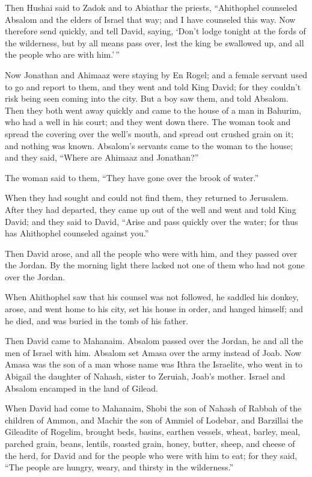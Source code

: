  Then Hushai said to Zadok and to Abiathar the priests,
``Ahithophel counseled Absalom and the elders of Israel that way; and I
have counseled this way.  Now therefore send quickly, and
tell David, saying, `Don't lodge tonight at the fords of the wilderness,
but by all means pass over, lest the king be swallowed up, and all the
people who are with him.'\,''

 Now Jonathan and Ahimaaz were staying by En Rogel; and a
female servant used to go and report to them, and they went and told
King David; for they couldn't risk being seen coming into the city.
 But a boy saw them, and told Absalom. Then they both
went away quickly and came to the house of a man in Bahurim, who had a
well in his court; and they went down there.  The woman
took and spread the covering over the well's mouth, and spread out
crushed grain on it; and nothing was known.  Absalom's
servants came to the woman to the house; and they said, ``Where are
Ahimaaz and Jonathan?''

The woman said to them, ``They have gone over the brook of water.''

When they had sought and could not find them, they returned to
Jerusalem.  After they had departed, they came up out of
the well and went and told King David; and they said to David, ``Arise
and pass quickly over the water; for thus has Ahithophel counseled
against you.''

 Then David arose, and all the people who were with him,
and they passed over the Jordan. By the morning light there lacked not
one of them who had not gone over the Jordan.

 When Ahithophel saw that his counsel was not followed,
he saddled his donkey, arose, and went home to his city, set his house
in order, and hanged himself; and he died, and was buried in the tomb of
his father.

 Then David came to Mahanaim. Absalom passed over the
Jordan, he and all the men of Israel with him.  Absalom
set Amasa over the army instead of Joab. Now Amasa was the son of a man
whose name was Ithra the Israelite, who went in to Abigail the daughter
of Nahash, sister to Zeruiah, Joab's mother.  Israel and
Absalom encamped in the land of Gilead.

 When David had come to Mahanaim, Shobi the son of Nahash
of Rabbah of the children of Ammon, and Machir the son of Ammiel of
Lodebar, and Barzillai the Gileadite of Rogelim,  brought
beds, basins, earthen vessels, wheat, barley, meal, parched grain,
beans, lentils, roasted grain,  honey, butter, sheep, and
cheese of the herd, for David and for the people who were with him to
eat; for they said, ``The people are hungry, weary, and thirsty in the
wilderness.''

